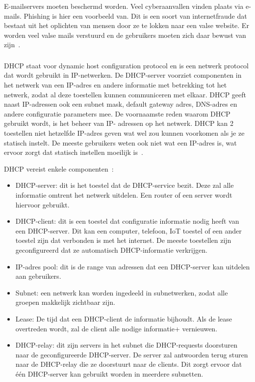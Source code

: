 E-mailservers moeten beschermd worden. Veel cyberaanvallen vinden plaats via e-mails. Phishing is hier een voorbeeld van. Dit is een soort van internetfraude dat bestaat uit het oplichten van mensen door ze te lokken naar een valse website. Er worden veel valse mails verstuurd en de gebruikers moeten zich daar bewust van zijn~\autocite{Gatefy2021}.
 
\subsubsection{}
\label{subsubsec:DHCP-server}
DHCP staat voor dynamic host configuration protocol en is een netwerk protocol dat wordt gebruikt in IP-netwerken. De DHCP-server voorziet componenten in het netwerk van een IP-adres en andere informatie met betrekking tot het netwerk, zodat al deze toestellen kunnen communiceren met elkaar. DHCP geeft naast IP-adressen ook een subnet mask, default gateway adres, DNS-adres en andere configuratie parameters mee. De voornaamste reden waarom DHCP gebruikt wordt, is het beheer van IP- adressen op het netwerk. DHCP kan 2 toestellen niet hetzelfde IP-adres geven wat wel zou kunnen voorkomen als je ze statisch instelt. De meeste gebruikers weten ook niet wat een IP-adres is, wat ervoor zorgt dat statisch instellen moeilijk is~\autocite{Kerravala2018}.

DHCP vereist enkele componenten~\autocite{Kerravala2018}:
 \begin{itemize}
     \item DHCP-server: dit is het toestel dat de DHCP-service bezit. Deze zal alle informatie omtrent het netwerk uitdelen. Een router of een server wordt hiervoor gebruikt.
     \item DHCP-client: dit is een toestel dat configuratie informatie nodig heeft van een DHCP-server. Dit kan een computer, telefoon, IoT toestel of een ander toestel zijn dat verbonden is met het internet. De meeste toestellen zijn geconfigureerd dat ze automatisch DHCP-informatie verkrijgen.
     \item IP-adres pool: dit is de range van adressen dat een DHCP-server kan uitdelen aan gebruikers.
     \item Subnet: een netwerk kan worden ingedeeld in subnetwerken, zodat alle groepen makkelijk zichtbaar zijn.
     \item Lease: De tijd dat een DHCP-client de informatie bijhoudt. Als de lease overtreden wordt, zal de client alle nodige informatie+ vernieuwen.
     \item DHCP-relay: dit zijn servers in het subnet die DHCP-requests doorsturen naar de geconfigureerde DHCP-server. De server zal antwoorden terug sturen naar de DHCP-relay die ze doorstuurt naar de clients. Dit zorgt ervoor dat één DHCP-server kan gebruikt worden in meerdere subnetten.
 \end{itemize}


